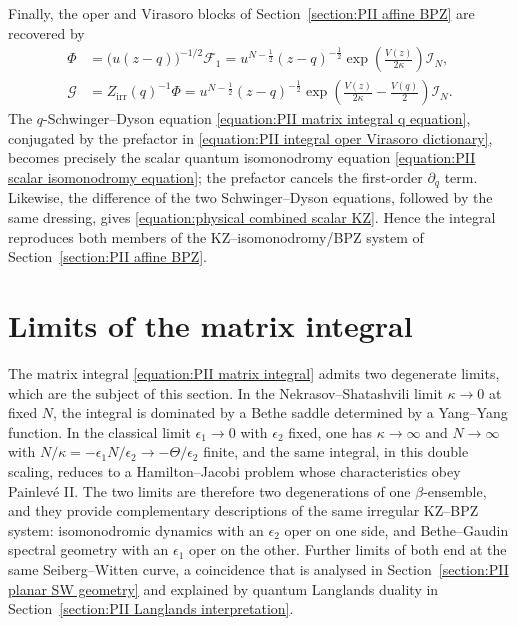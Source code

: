 \documentclass[a4paper,11pt]{article}
\newcommand{\cF}{\mathcal{F}}
\numberwithin{equation}{section}
\begin{document}
Finally, the oper and Virasoro blocks of Section~\ref{section:PII affine BPZ} are recovered by
\begin{equation}
	\label{equation:PII integral oper Virasoro dictionary}
	\begin{aligned}
		\Phi
		&=
		\bigl(u(z-q)\bigr)^{-1/2}\cF_{1}
		=
		u^{N-\frac{1}{2}}(z-q)^{-\frac{1}{2}}
		\exp\left(\frac{V(z)}{2\kappa}\right)\mathcal{I}_{N},
		\\
		\mathcal{G}
		&=
		Z_{\mathrm{irr}}(q)^{-1}\Phi
		=
		u^{N-\frac{1}{2}}(z-q)^{-\frac{1}{2}}
		\exp\left(\frac{V(z)}{2\kappa}-\frac{V(q)}{2}\right)
		\mathcal{I}_{N}.
	\end{aligned}
\end{equation}
The $q$-Schwinger--Dyson equation
\eqref{equation:PII matrix integral q equation}, conjugated by the
prefactor in \eqref{equation:PII integral oper Virasoro dictionary},
becomes precisely the scalar quantum isomonodromy equation
\eqref{equation:PII scalar isomonodromy equation}; the prefactor
cancels the first-order $\partial_{q}$ term.
Likewise, the difference of the two Schwinger--Dyson equations,
followed by the same dressing, gives
\eqref{equation:physical combined scalar KZ}.  Hence the integral
reproduces both members of the KZ--isomonodromy/BPZ system of Section~\ref{section:PII affine BPZ}.

\section{Limits of the matrix integral}
\label{section:PII limits}

The matrix integral \eqref{equation:PII matrix integral} admits two
degenerate limits, which are the subject of this section.  In the
Nekrasov--Shatashvili limit $\kappa\to0$ at fixed $N$, the integral is
dominated by a Bethe saddle determined by a Yang--Yang function.  In
the classical limit $\epsilon_{1}\to0$ with $\epsilon_{2}$ fixed, one
has $\kappa\to\infty$ and $N\to\infty$ with
$N/\kappa=-\epsilon_{1}N/\epsilon_{2}\to-\Theta/\epsilon_{2}$ finite,
and the same integral, in this double scaling, reduces to a
Hamilton--Jacobi problem whose characteristics obey Painlev\'e II.
The two limits are therefore two degenerations of one
$\beta$-ensemble, and they provide complementary descriptions of the
same irregular KZ--BPZ system: isomonodromic dynamics with an
$\epsilon_{2}$ oper on one side, and Bethe--Gaudin spectral geometry
with an $\epsilon_{1}$ oper on the other.  Further limits of both end at the same
Seiberg--Witten curve, a coincidence that is analysed in
Section~\ref{section:PII planar SW geometry} and explained by quantum
Langlands duality in Section~\ref{section:PII Langlands interpretation}.
\end{document}
